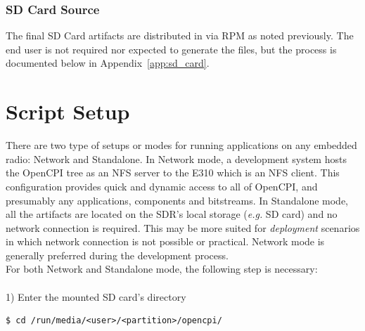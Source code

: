 \subsubsection{SD Card Source}
The final SD Card artifacts are distributed in  via RPM as noted previously. The end user is not required nor expected to generate the files, but the process is documented below in Appendix~\ref{app:sd_card}.


\section{Script Setup}
There are two type of setups or modes for running applications on any embedded radio: Network and Standalone. In Network mode, a development system hosts the OpenCPI tree as an NFS server to the E310 which is an NFS client. This configuration provides quick and dynamic access to all of OpenCPI, and presumably any applications, components and bitstreams. In Standalone mode, all the artifacts are located on the SDR's local storage (\textit{e.g.} SD card) and no network connection is required. This may be more suited for \textit{deployment} scenarios in which network connection is not possible or practical. Network mode is generally preferred during the development process.\\

\noindent For both Network and Standalone mode, the following step is necessary:\\\\
1) Enter the mounted SD card's  directory
\begin{verbatim}
$ cd /run/media/<user>/<partition>/opencpi/
\end{verbatim}

